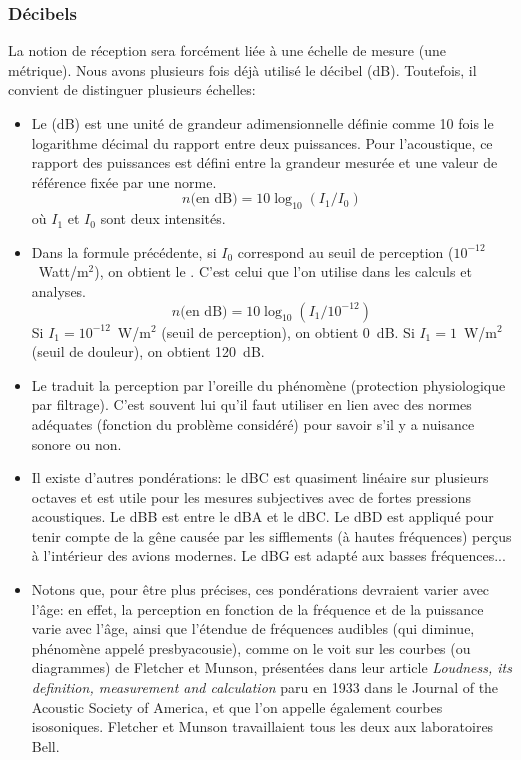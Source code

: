 \medskip
\subsubsection{Décibels}

La notion de réception sera forcément liée à une échelle de mesure (une métrique). Nous avons plusieurs fois déjà utilisé le décibel (dB). Toutefois, il convient de distinguer plusieurs échelles:
\begin{itemize}
   \item Le  (dB) est une unité de grandeur adimensionnelle définie comme 10 fois le logarithme décimal du rapport entre deux puissances. Pour l'acoustique, ce rapport des puissances est défini entre la grandeur mesurée et une valeur de référence fixée par une norme.
   \begin{equation}
   n \text{(en dB)} = 10 \log_{10} (I_1/I_0)
   \end{equation}
   où $I_1$ et $I_0$ sont deux intensités.
   
   \item Dans la formule précédente, si $I_0$ correspond au seuil de perception ($10^{-12}$~Watt/m$^2$), on obtient le . C'est celui que l'on utilise dans les calculs et analyses.
   \begin{equation}
   n \text{(en dB)} = 10 \log_{10} (I_1/10^{-12})
   \end{equation}
   Si $I_1 = 10^{-12}$~W/m$^2$ (seuil de perception), on obtient 0~dB.
   Si $I_1 = 1$~W/m$^2$ (seuil de douleur), on obtient 120~dB.

   \item Le  traduit la perception par l'oreille du phénomène (protection physiologique par filtrage). C'est souvent lui qu'il faut utiliser en lien avec des normes adéquates (fonction du problème considéré) pour savoir s'il y a nuisance sonore ou non.

   \item Il existe d'autres pondérations: le dBC est quasiment linéaire sur plusieurs octaves et est utile pour les mesures subjectives avec de fortes pressions acoustiques. Le dBB est entre le dBA et le dBC. Le dBD est appliqué pour tenir compte de la gêne causée par les sifflements (à hautes fréquences) perçus à l'intérieur des avions modernes. Le dBG est adapté aux basses fréquences...

  \item  Notons que, pour être plus précises, ces pondérations devraient varier avec l'âge: en effet, la perception en fonction de la fréquence et de la puissance varie avec l'âge, ainsi que l'étendue de fréquences audibles (qui diminue, phénomène appelé presbyacousie), comme on le voit sur les courbes (ou diagrammes) de Fletcher et Munson, présentées dans leur article \emph{Loudness, its definition, measurement and calculation} paru en 1933 dans le Journal of the Acoustic Society of America, et que l'on appelle également courbes isosoniques. Fletcher et Munson travaillaient tous les deux aux laboratoires Bell. 
\end{itemize}

